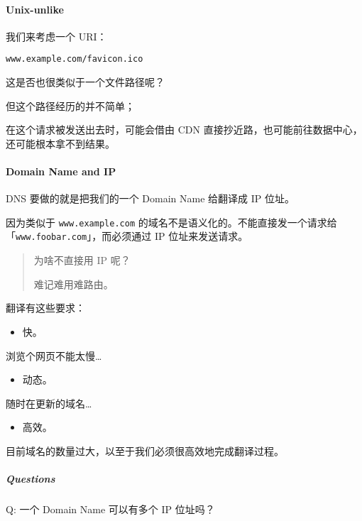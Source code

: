 \documentclass[
]{article}
\begin{document}
\hypertarget{header-n91}{%
\paragraph{Unix-unlike}\label{header-n91}}

我们来考虑一个 URI：

\begin{verbatim}
www.example.com/favicon.ico
\end{verbatim}

这是否也很类似于一个文件路径呢？

但这个路径经历的并不简单；

在这个请求被发送出去时，可能会借由 CDN
直接抄近路，也可能前往数据中心，还可能根本拿不到结果。

\hypertarget{header-n97}{%
\paragraph{Domain Name and IP}\label{header-n97}}

DNS 要做的就是把我们的一个 Domain Name 给翻译成 IP 位址。

因为类似于 \texttt{www.example.com}
的域名不是语义化的。不能直接发一个请求给「\texttt{www.foobar.com}」，而必须通过
IP 位址来发送请求。

\begin{quote}
为啥不直接用 IP 呢？

难记难用难路由。
\end{quote}

翻译有这些要求：

\begin{itemize}
\item
  快。
\end{itemize}

浏览个网页不能太慢\ldots{}

\begin{itemize}
\item
  动态。
\end{itemize}

随时在更新的域名\ldots{}

\begin{itemize}
\item
  高效。
\end{itemize}

目前域名的数量过大，以至于我们必须很高效地完成翻译过程。

\hypertarget{header-n116}{%
\subparagraph{Questions}\label{header-n116}}

Q: 一个 Domain Name 可以有多个 IP 位址吗？
\end{document}
